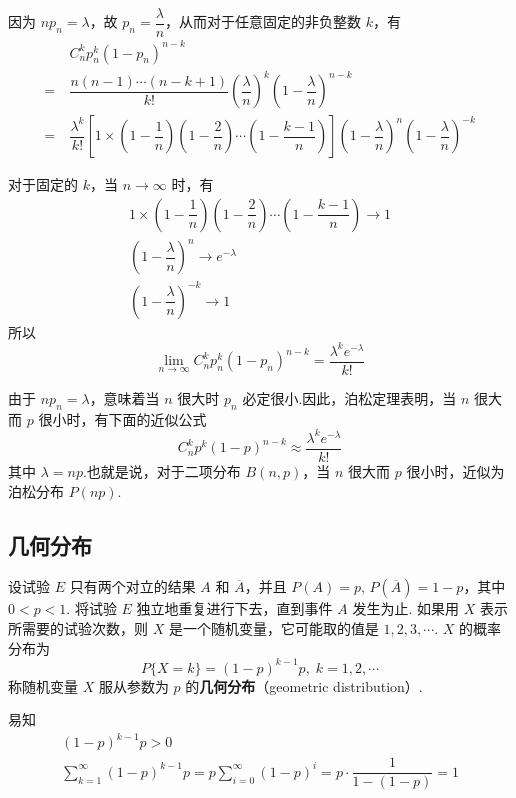 \begin{myproof}
    因为 $n p_n=\lambda$，故 $p_n=\dfrac{\lambda}{n}$，从而对于任意固定的非负整数 $k$，有
    $$
    \begin{aligned}
        & C_n^k p_n^k (1-p_n)^{n-k}\\
        =\ & \dfrac{n(n-1) \cdots (n-k+1)}{k!} \left( \dfrac{\lambda}{n} \right)^k \left( 1-\dfrac{\lambda}{n} \right)^{n-k}\\
        =\ & \dfrac{\lambda^k}{k!} \left[ 1 \times \left( 1-\dfrac{1}{n} \right) \left( 1-\dfrac{2}{n} \right) \cdots \left( 1-\dfrac{k-1}{n} \right) \right] \left( 1-\dfrac{\lambda}{n} \right)^n \left( 1-\dfrac{\lambda}{n} \right)^{-k}
    \end{aligned}
    $$

    对于固定的 $k$，当 $n\to\infty$ 时，有
    \begin{gather*}
        1 \times \left( 1-\dfrac{1}{n} \right) \left( 1-\dfrac{2}{n} \right) \cdots \left( 1-\dfrac{k-1}{n} \right) \to 1 \\
        \left( 1-\dfrac{\lambda}{n} \right)^n \to e^{-\lambda} \\
        \left( 1-\dfrac{\lambda}{n} \right)^{-k}\to 1
    \end{gather*}
    所以
    $$
    \lim_{n\to\infty} C_n^k p_n^k (1-p_n)^{n-k} = \dfrac{\lambda^k e^{-\lambda}}{k!}
    $$
\end{myproof}

由于 $n p_n=\lambda$，意味着当 $n$ 很大时 $p_n$ 必定很小.因此，泊松定理表明，当 $n$ 很大而 $p$ 很小时，有下面的近似公式
$$
C_n^k p^k (1-p)^{n-k}\approx \dfrac{\lambda^k e^{-\lambda}}{k!}
$$
其中 $\lambda=np$.也就是说，对于二项分布 $B(n,p)$，当 $n$ 很大而 $p$ 很小时，近似为泊松分布 $P(np)$.

\subsection{几何分布}

设试验 $E$ 只有两个对立的结果 $A$ 和 $\overline{A}$，并且 $P(A)=p, \, P(\overline{A})=1-p$，其中 $0<p<1$. 将试验 $E$ 独立地重复进行下去，直到事件 $A$ 发生为止. 如果用 $X$ 表示所需要的试验次数，则 $X$ 是一个随机变量，它可能取的值是 $1,2,3,\cdots$. $X$ 的概率分布为
$$
P\{X=k\}=(1-p)^{k-1} p, \; k=1,2,\cdots
$$
称随机变量 $X$ 服从参数为 $p$ 的\textbf{几何分布}（geometric distribution）.

易知
\begin{gather*}
    (1-p)^{k-1} p > 0\\
    \sum_{k=1}^\infty (1-p)^{k-1} p = p \sum_{i=0}^\infty (1-p)^i = p \cdot \dfrac{1}{1-(1-p)} = 1    
\end{gather*}
\newline

